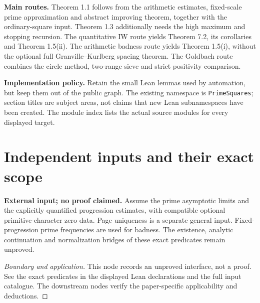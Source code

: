 \textbf{Main routes.}
Theorem 1.1 follows from the arithmetic estimates, fixed-scale prime
approximation and abstract improving theorem, together with the ordinary-square
input. Theorem 1.3 additionally needs the high maximum and stopping recursion.
The quantitative IW route yields Theorem 7.2, its corollaries and Theorem 1.5(ii).
The arithmetic badness route yields Theorem 1.5(i), without the optional full
Granville--Kurlberg spacing theorem. The Goldbach route combines the circle
method, two-range sieve and strict positivity comparison.

\textbf{Implementation policy.}
Retain the small Lean lemmas used by automation, but keep them out of the
public graph. The existing namespace is \texttt{PrimeSquares}; section titles
are subject areas, not claims that new Lean subnamespaces have been created.
The module index lists the actual source modules for every displayed target.

\section{Independent inputs and their exact scope}

\begin{lemma}
\label{input_prime_distribution}
\textbf{External input; no proof claimed.} Assume the prime asymptotic limits and the explicitly quantified progression estimates, with compatible optional primitive-character zero data. Page uniqueness is a separate general input. Fixed-progression prime frequencies are used for badness. The existence, analytic continuation and normalization bridges of these exact predicates remain unproved.
\end{lemma}
\begin{proof}[Boundary and application]
This node records an unproved interface, not a proof. See the exact predicates in the displayed Lean declarations and the full input catalogue. The downstream nodes verify the paper-specific applicability and deductions.
\end{proof}

